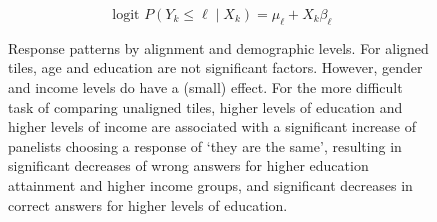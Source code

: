 \documentclass[
]{jds}
\begin{document}
\begin{equation}
\text{ logit } P(Y_k \le \ell \mid X_k) = \mu_\ell + X_{k}\beta_{\ell}
\end{equation}

\begin{figure}

\begin{minipage}[t]{\linewidth}

{\centering 


}

\end{minipage}%
\newline
\begin{minipage}[t]{\linewidth}

{\centering 


}

\end{minipage}%

\caption{\label{fig-demographics}Response patterns by alignment and
demographic levels. For aligned tiles, age and education are not
significant factors. However, gender and income levels do have a (small)
effect. For the more difficult task of comparing unaligned tiles, higher
levels of education and higher levels of income are associated with a
significant increase of panelists choosing a response of `they are the
same', resulting in significant decreases of wrong answers for higher
education attainment and higher income groups, and significant decreases
in correct answers for higher levels of education.}

\end{figure}
\end{document}
